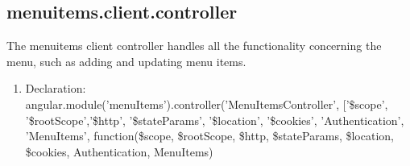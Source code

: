 \documentclass[a4paper,12pt]{article}
\begin{document}
\subsection{menuitems.client.controller}
The menuitems client controller handles all the functionality concerning the menu, such as adding and updating menu items.
\begin{enumerate}
\item Declaration: \\angular.module('menuItems').controller('MenuItemsController', ['\$scope', '\$rootScope','\$http', '\$stateParams', '\$location', '\$cookies', 'Authentication', 'MenuItems',
	function(\$scope, \$rootScope, \$http, \$stateParams, \$location, \$cookies, Authentication, MenuItems)
	

\end{enumerate}
\end{document}
